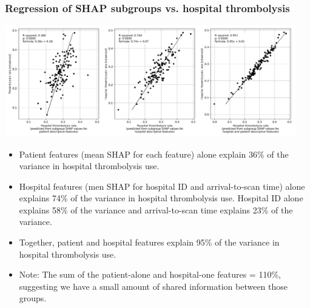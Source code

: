 \begin{frame}
\frametitle{Regression of SHAP subgroups vs. hospital thrombolysis}

\begin{center}
\includegraphics[width=0.95\textwidth]{./images/03e_xgb_10_features_multiple_regression_patient_hosptia_mean.jpg}
\end{center}

\scriptsize
\begin{itemize}
    \item Patient features (mean SHAP for each feature) alone explain 36\% of the variance in hospital thrombolysis use.
    \item Hospital features (men SHAP for hospital ID and arrival-to-scan time) alone explains 74\% of the variance in hospital thrombolysis use. Hospital ID alone explains 58\% of the variance and arrival-to-scan time explains 23\% of the variance.
    \item Together, patient and hospital features explain 95\% of the variance in hospital thrombolysis use.
    \item Note: The sum of the patient-alone and hospital-one features = 110\%, suggesting we have a small amount of shared information between those groups.
\end{itemize}
 
\end{frame}